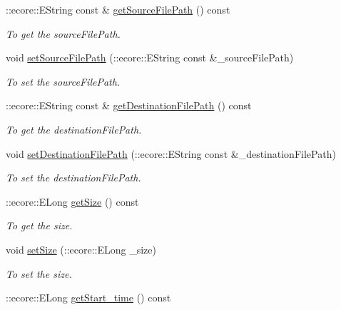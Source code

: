 \begin{DoxyCompactItemize}
::ecore::EString const \& \hyperlink{classFMS__Data_1_1FileTransfer_abcf8f787a0fe5655b18733717cd765b1}{getSourceFilePath} () const 
\begin{DoxyCompactList}\small\item\em To get the sourceFilePath. \item\end{DoxyCompactList}\item 
void \hyperlink{classFMS__Data_1_1FileTransfer_a8a957a4b9196c976513666ebbbd4d787}{setSourceFilePath} (::ecore::EString const \&\_\-sourceFilePath)
\begin{DoxyCompactList}\small\item\em To set the sourceFilePath. \item\end{DoxyCompactList}\item 
::ecore::EString const \& \hyperlink{classFMS__Data_1_1FileTransfer_abe0d498a3bbd3cf1a7968327afc6e192}{getDestinationFilePath} () const 
\begin{DoxyCompactList}\small\item\em To get the destinationFilePath. \item\end{DoxyCompactList}\item 
void \hyperlink{classFMS__Data_1_1FileTransfer_ab189cff53b0e38bd1cbfcb9cae081f8f}{setDestinationFilePath} (::ecore::EString const \&\_\-destinationFilePath)
\begin{DoxyCompactList}\small\item\em To set the destinationFilePath. \item\end{DoxyCompactList}\item 
::ecore::ELong \hyperlink{classFMS__Data_1_1FileTransfer_aeefe065a34a1dea4c756b9117397ff61}{getSize} () const 
\begin{DoxyCompactList}\small\item\em To get the size. \item\end{DoxyCompactList}\item 
void \hyperlink{classFMS__Data_1_1FileTransfer_afd55e4679529080f31d0d86f99c38e33}{setSize} (::ecore::ELong \_\-size)
\begin{DoxyCompactList}\small\item\em To set the size. \item\end{DoxyCompactList}\item 
::ecore::ELong \hyperlink{classFMS__Data_1_1FileTransfer_a6492fc9a39d137529b2f8bc8ab0a3a3c}{getStart\_\-time} () const 

\end{DoxyCompactItemize}
